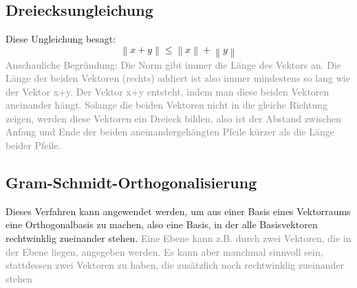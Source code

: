 \documentclass{article}
\begin{document}
		\subsection{Dreiecksungleichung}
			Diese Ungleichung besagt:
			\begin{equation}
				\left\lVert x+y \right\rVert \leq \left\lVert x \right\rVert + \left\lVert y \right\rVert
			\end{equation}
			\textcolor{gray}{Anschauliche Begründung: Die Norm gibt immer die Länge des Vektors an. Die Länge der beiden Vektoren (rechts) addiert ist also immer mindestens so lang wie der Vektor x+y. Der Vektor x+y entsteht, indem man diese beiden Vektoren aneinander hängt. Solange die beiden Vektoren nicht in die gleiche Richtung zeigen, werden diese Vektoren ein Dreieck bilden, also ist der Abstand zwischen Anfang und Ende der beiden aneinandergehängten Pfeile  kürzer als die Länge beider Pfeile.}
		\subsection{Gram-Schmidt-Orthogonalisierung}
			Dieses Verfahren kann angewendet werden, um aus einer Basis eines Vektorraums eine Orthogonalbasis zu machen, also eine Basis, in der alle Basisvektoren rechtwinklig zueinander stehen. 
			\textcolor{gray}{Eine Ebene kann z.B. durch zwei Vektoren, die in der Ebene liegen, angegeben werden. Es kann aber manchmal sinnvoll sein, stattdessen zwei Vektoren zu haben, die zusätzlich noch rechtwinklig zueinander stehen}
\end{document}
